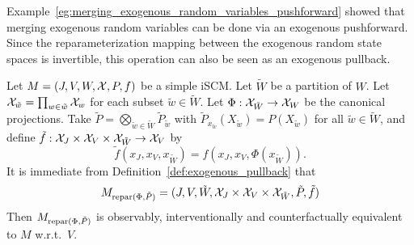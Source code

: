 Example~\ref{eg:merging_exogenous_random_variables_pushforward} showed that merging exogenous random variables can be done via an exogenous pushforward.
Since the reparameterization mapping between the exogenous random state spaces is invertible, this operation can also be seen as an exogenous pullback.
\begin{Eg}\label{eg:merging_exogenous_random_variables_pullback}
  Let $M = \left ( J, V, W, \mathcal{X}, P, f \right )$ be a simple iSCM.
  Let $\tilde{W}$ be a partition of $W$.
  Let $\mathcal{X}_{\tilde{w}} = \prod_{w \in \tilde{w}} \mathcal{X}_w$ for each subset $\tilde{w} \in \tilde{W}$.
  Let $\Phi: \mathcal{X}_{\tilde{W}} \to \mathcal{X}_W$ be the canonical projections.
  Take
  $\tilde{P} = \bigotimes_{\tilde{w}\in \tilde{W}}\tilde{P}_{\tilde{w}}$ with $\tilde{P}_{x_{\tilde{w}}}(X_{\tilde{w}}) = P(X_{\tilde{w}})$ for all $\tilde{w} \in \tilde{W}$, and
  define $\tilde{f} : \mathcal{X}_{J} \times \mathcal{X}_{V} \times \mathcal{X}_{\tilde{W}} \to \mathcal{X}_{V}$ by
    $$\tilde{f}(x_J,x_V,x_{\tilde{W}}) = f(x_J,x_V,\Phi(x_{\tilde{W}})).$$
  It is immediate from Definition~\ref{def:exogenous_pullback} that 
  $$M_{\mathrm{repar}({\Phi},{\tilde{P}})} = ( J, V, \tilde{W}, \mathcal{X}_J \times \mathcal{X}_V \times \mathcal{X}_{\tilde{W}}, \tilde{P}, \tilde{f} )$$
  Then $M_{\mathrm{repar}({\Phi},{\tilde{P}})}$ is observably, interventionally and counterfactually equivalent to $M$ w.r.t.\ $V$.
\end{Eg}

